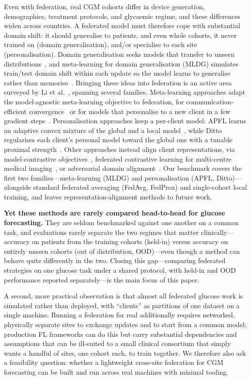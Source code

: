 \documentclass[10pt,letterpaper]{article}
\begin{document}
Even with federation, real CGM cohorts differ in device generation, demographics,
treatment protocols, and glycaemic regime, and these differences widen across
countries. A federated model must therefore cope with substantial domain shift: it
should generalise to patients, and even whole cohorts, it never trained on (domain
generalisation), and/or specialise to each site (personalisation). Domain
generalisation seeks models that transfer to unseen
distributions~\cite{zhou2022dgsurvey}, and meta-learning for domain generalisation
(MLDG) simulates train/test domain shift within each update so the model learns to
generalise rather than memorise~\cite{li2018mldg}. Bringing these ideas into
federation is an active area surveyed by Li et al.~\cite{li2025fedDGsurvey},
spanning several families. Meta-learning approaches adapt the model-agnostic
meta-learning objective to federation, for communication-efficient
convergence~\cite{chen2018fedmeta} or for models that personalise to a new client
in a few gradient steps~\cite{fallah2020perfedavg}. Personalisation approaches keep
a per-client model: APFL learns an adaptive convex mixture of the global and a
local model~\cite{deng2020apfl}, while Ditto regularises each client's personal
model toward the global one with a tunable proximal strength~\cite{li2021ditto}.
Other approaches instead align client representations, via model-contrastive
objectives~\cite{li2021moon}, federated contrastive learning for multi-centre
medical imaging~\cite{fedcl2023}, or adversarial domain
alignment~\cite{flda2023,fedadv2022}. Our benchmark covers the first two
families---meta-learning (MLDG) and personalisation (APFL, Ditto)---alongside
standard federated averaging (FedAvg, FedProx) and single-cohort local training,
and leaves representation-alignment methods to future work.

\textbf{Yet these methods are rarely compared head-to-head for glucose
forecasting.} They are seldom benchmarked against one another on a common task, and
evaluations rarely separate the two regimes that matter clinically---accuracy on
patients from the training cohorts (held-in) versus accuracy on entirely unseen
cohorts (out of distribution, OOD)---even though a method can behave quite
differently in the two. Closing this gap---comparing federated strategies on one
glucose task under a shared protocol, with held-in and OOD performance reported
separately---is the main focus of this paper.

A second, more practical observation is that almost all federated glucose work is
simulated rather than deployed, with ``clients'' as partitions of one dataset on a
single machine. Running a federation for real additionally requires networked,
physically separate sites to exchange updates and to start from a common model;
production FL frameworks can do this but carry substantial dependencies and
assumptions that can be ill-suited to a small clinical consortium that simply wants
a handful of sites, one cohort each, to train together. We therefore also ask a
feasibility question: whether a lightweight cross-site federation for CGM
forecasting can be built and run across real machines with minimal tooling.
\end{document}
